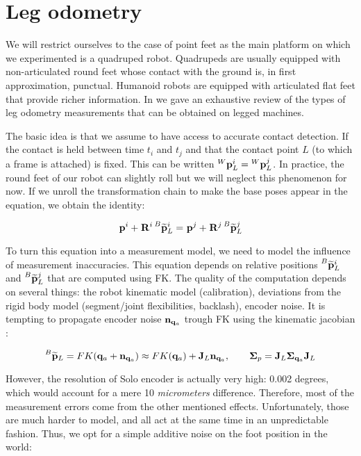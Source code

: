 \section{Leg odometry}
We will restrict ourselves to the case of point feet as the main platform on which we experimented is a quadruped robot.
Quadrupeds are usually equipped with non-articulated round feet whose contact with the ground is, in first approximation, punctual.
Humanoid robots are equipped with articulated flat feet that provide richer information. In  we gave an exhaustive review of the types of leg 
odometry measurements that can be obtained on legged machines.

The basic idea is that we assume to have access to accurate contact detection. If the contact is held between time $t_i$ and $t_j$ and that
the contact point $L$ (to which a frame is attached) is fixed. This can be written $\prescript{W}{}{{\bf p}}_{L}^i = \prescript{W}{}{{\bf p}}_{L}^j$. 
In practice, the round feet of our robot can slightly roll but we will neglect this phenomenon for now. 
If we unroll the transformation chain to make the base poses appear in the equation, we obtain the identity:

\begin{equation}
    \prescript{}{}{{\bf p}}_{}^i + \prescript{}{}{{\bf R}}_{}^i \prescript{B}{}{\widetilde{{\bf p}}}_{L}^i = \prescript{}{}{{\bf p}}_{}^j + \prescript{}{}{{\bf R}}_{}^j \prescript{B}{}{\widetilde{{\bf p}}}_{L}^j
\end{equation}

To turn this equation into a measurement model, we need to model the influence of measurement inaccuracies.
This equation depends on relative positions $\prescript{B}{}{\widetilde{{\bf p}}}_{L}^i$ and $\prescript{B}{}{\widetilde{{\bf p}}}_{L}^j$ that are computed using FK. The quality of the computation depends on several things:
the robot kinematic model (calibration), deviations from the rigid body model (\eg segment/joint flexibilities, backlash), encoder noise.
It is tempting to propagate encoder noise ${\bf n}_{{\bf q}_a}$ trough FK using the kinematic jacobian \cite{bloesch2013state, hartley2018legged}:

\begin{equation}
    \prescript{B}{}{\widetilde{{\bf p}}}_{L} = FK({\bf q}_a + {\bf n}_{{\bf q}_a}) \approx FK({\bf q}_a) + {\bf J}_L{\bf n}_{{\bf q}_a}, \quad \quad {\bm \Sigma}_{p} = {\bf J}_L {\bm \Sigma}_{{\bf q}_a} {\bf J}_L
\end{equation}

However, the resolution of Solo encoder is actually very high: 0.002 degrees, which would account for a mere 10 \textit{micrometers} difference.
Therefore, most of the measurement errors come from the other mentioned effects. Unfortunately, those are much harder to model, and all act at the same time
in an unpredictable fashion. Thus, we opt for a simple additive noise on the foot position in the world:

